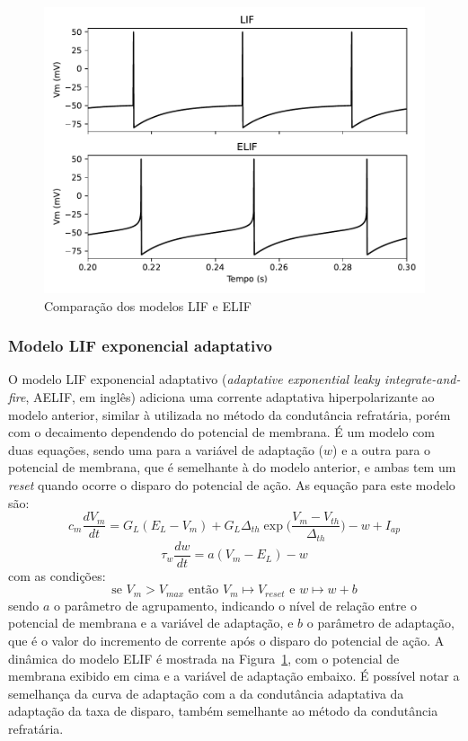 \begin{figure}[tb]
	\centering
	\caption{Comparação dos modelos LIF e ELIF}
	\label{fig:elif}
	\includegraphics[width=0.7\linewidth]{figs/elif}
\end{figure}

\subsubsection{Modelo LIF exponencial adaptativo}
O modelo LIF exponencial adaptativo (\textit{adaptative exponential leaky integrate-and-fire}, AELIF, em inglês) adiciona uma corrente adaptativa hiperpolarizante ao modelo anterior, similar à utilizada no método da condutância refratária, porém com o decaimento dependendo do potencial de membrana. É um modelo com duas equações, sendo uma para a variável de adaptação ($w$) e a outra para o potencial de membrana, que é semelhante à do modelo anterior, e ambas tem um \textit{reset} quando ocorre o disparo do potencial de ação.
As equação para este modelo são:
\begin{equation}
	c_m\frac{dV_m}{dt} = G_L(E_L-V_m) + G_L\Delta_{th}\exp\Big(\frac{V_m-V_{th}}{\Delta_{th}}\Big) - w + I_{ap}
\end{equation}
\begin{equation}
	\tau_w\frac{dw}{dt}=a(V_m-E_L)-w
\end{equation}
com as condições:
\begin{equation}
	\text{se } V_m > V_{max} \text{ então } V_m\mapsto V_{reset} \text{ e } w\mapsto w + b
\end{equation}
sendo $a$ o parâmetro de agrupamento, indicando o nível de relação entre o potencial de membrana e a variável de adaptação, e $b$ o parâmetro de adaptação, que é o valor do incremento de corrente após o disparo do potencial de ação. A dinâmica do modelo ELIF é mostrada na Figura~\ref{fig:elif}, com o potencial de membrana exibido em cima e a variável de adaptação embaixo. É possível notar a semelhança da curva de adaptação com a da condutância adaptativa da adaptação da taxa de disparo, também semelhante ao método da condutância refratária.


